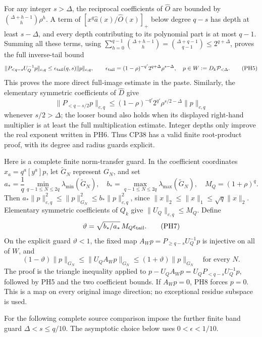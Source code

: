 \documentclass[10pt]{article}
\begin{document}
For any integer \(s>\Delta\), the reciprocal coefficients of \(\widehat O\) are bounded by \(\binom{\Delta+h-1}{h}\rho^h\). A term of \([x^q\widehat a(x)/\widehat O(x)]_+\) below degree \(q-s\) has depth at least \(s-\Delta\), and every depth contributing to its polynomial part is at most \(q-1\). Summing all these terms, using \(\sum_{h=0}^{q-1}\binom{\Delta+h-1}{h}
=\binom{\Delta+q-1}{q-1}\le2^{q+\Delta}\), proves the full inverse-tail bound \[
 \|P_{<q-s}U_Q^{-1}p\|_{c,q}
 \le \epsilon_{\rm tail}(q,s)\|p\|_{c,q},\qquad
 \epsilon_{\rm tail}=(1-\rho)^{-q'}2^{q+\Delta}\rho^{s-\Delta},
 \quad p\in W:=D_k\mathcal P_{<\Delta}.
 \tag{PH5}
\] This proves the more direct full-image estimate in the paste. Similarly, the elementary symmetric coefficients of \(\widehat D\) give \[
 \|P_{<q-s/2}p\|_{c,q}
 \le(1-\rho)^{-q'}2^{q'}\rho^{s/2-\Delta}\|p\|_{c,q}
 \tag{PH6}
\] whenever \(s/2>\Delta\); the looser bound also holds when its displayed right-hand multiplier is at least the full multiplication estimate. Integer depths only improve the real exponent written in PH6. Thus CP38 has a valid finite root-product proof, with its degree and radius guards explicit.

Here is a complete finite norm-transfer guard. In the coefficient coordinates \(x_a=q^a[y^a]p\), let \(\widetilde G_N\) represent \(G_N\), and set \[
 a_*=\frac1q\min_{q-1\le N\le2q}\lambda_{\min}(\widetilde G_N),
 \quad b_*=\max_{q-1\le N\le2q}\lambda_{\max}(\widetilde G_N),
 \quad M_Q=(1+\rho)^q .
\] Then \(a_*\|p\|_{c,q}^2\le\|p\|_{G_N}^2\le b_*\|p\|_{c,q}^2\), since \(\|x\|_2\le\|x\|_1\le\sqrt q\|x\|_2\). Elementary symmetric coefficients of \(Q_k\) give \(\|U_Q\|_{c,q}\le M_Q\). Define \[
 \vartheta=\sqrt{b_*/a_*}\,M_Q\epsilon_{\rm tail}.
 \tag{PH7}
\] On the explicit guard \(\vartheta<1\), the fixed map \(A_Wp=P_{\ge q-s}U_Q^{-1}p\) is injective on all of \(W\), and \[
 (1-\vartheta)\|p\|_{G_N}
 \le\|U_QA_Wp\|_{G_N}
 \le(1+\vartheta)\|p\|_{G_N}\quad\text{for every }N.
 \tag{PH8}
\] The proof is the triangle inequality applied to \(p-U_QA_Wp=U_QP_{<q-s}U_Q^{-1}p\), followed by PH5 and the two coefficient bounds. If \(A_Wp=0\), PH8 forces \(p=0\). This is a map on every original image direction; no exceptional residue subspace is used.

For the following complete source comparison impose the further finite band guard \(\Delta<s\le q/10\). The asymptotic choice below uses \(0<\epsilon<1/10\).
\end{document}
